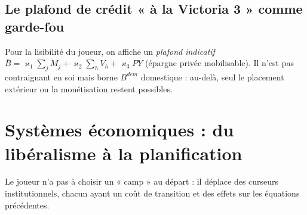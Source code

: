 \documentclass[11pt,a4paper]{article}
\newcommand{\og}{« }
\newcommand{\fg}{ »}
\begin{document}
\subsection{Le plafond de crédit \og à la Victoria 3\fg{} comme garde-fou}
Pour la lisibilité du joueur, on affiche un \emph{plafond indicatif} $\bar B = \varkappa_1 \sum_j M_j + \varkappa_2 \sum_h V_h + \varkappa_3 PY$ (épargne privée mobilisable). Il n'est pas contraignant en soi mais borne $B^{dem}$ domestique : au-delà, seul le placement extérieur ou la monétisation restent possibles.

\section{Systèmes économiques : du libéralisme à la planification}
\label{sec:systemes}

Le joueur n'a pas à choisir un \og camp\fg{} au départ : il déplace des curseurs institutionnels, chacun ayant un coût de transition et des effets sur les équations précédentes.
\end{document}
